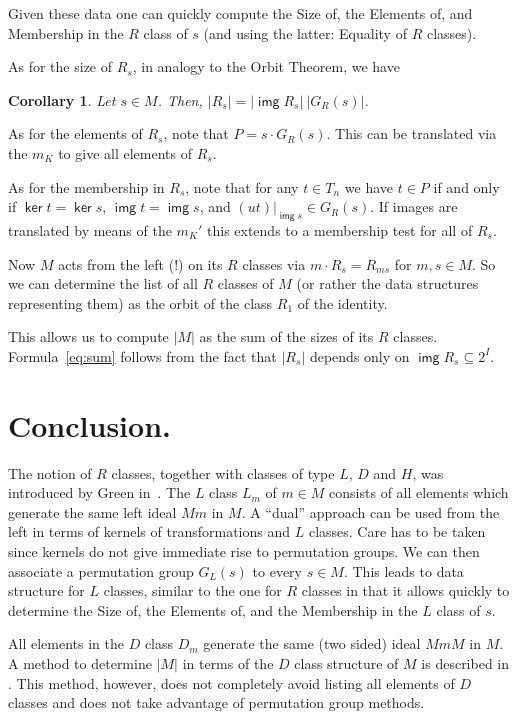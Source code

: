 \documentclass[12pt]{amsart}
\newtheorem{Cor}[Thm]{Corollary}
\newcommand{\img}{\mathop{\mathsf{img}}}
\renewcommand{\ker}{\mathop{\mathsf{ker}}}
\newcommand{\rest}{\big|}  %
\begin{document}
Given these  data one can quickly  compute the Size  of, the Elements of, and
Membership in the $R$ class  of $s$ (and using  the  latter: Equality of  $R$
classes).

As for the size of $R_s$, in analogy to the Orbit Theorem, we have
\begin{Cor}
  Let $s \in M$.  Then, $|R_s| = |\img R_s|\ |G_R(s)|$.
\end{Cor}

As for the  elements of $R_s$,  note that $P =  s \cdot G_R(s)$.  This can be
translated via the $m_K$ to give all elements of $R_s$.

As for the membership in $R_s$, note that for any $t \in T_n$  we have $t \in
P$ if and only if $\ker t = \ker s$, $\img t  = \img s$, and $(ut)\rest_{\img
  s} \in G_R(s)$.    If images are translated  by  means of  the $m_K'$  this
extends to a membership test for all of $R_s$.

Now $M$ acts from the left (!) on its $R$ classes  via $m \cdot R_s = R_{ms}$
for $m, s \in M$.  So we can determine the list of all $R$ classes of $M$ (or
rather the data structures representing them) as the orbit of the class $R_1$
of the identity.

This allows us to compute $|M|$ as the sum  of the sizes of  its $R$ classes. 
Formula~\ref{eq:sum}  follows  from the  fact  that  $|R_s|$ depends  only on
$\img R_s \subseteq 2^I$.

\section{Conclusion.}
The  notion of $R$ classes,  together with classes of type  $L$, $D$ and $H$,
was introduced by Green in~\cite{Green51}.  The $L$  class $L_m$ of $m \in M$
consists of all elements which generate  the same left  ideal $Mm$ in $M$.  A
``dual''  approach  can  be  used  from the   left in  terms   of kernels  of
transformations and $L$ classes.   Care has to  be taken since kernels do not
give   immediate  rise to  permutation   groups.  We  can  then  associate  a
permutation group $G_L(s)$ to every $s \in M$.  This  leads to data structure
for $L$ classes, similar to the one for $R$ classes in that it allows quickly
to  determine the Size  of, the Elements  of,  and the  Membership in the $L$
class of $s$.

All elements in the $D$ class $D_m$ generate the same (two sided) ideal $MmM$
in $M$.  A method to determine $|M|$ in  terms of the  $D$ class structure of
$M$ is described in \cite{LaMc90}.  This method, however, does not completely
avoid listing all   elements of $D$  classes  and does not take  advantage of
permutation group methods.
\end{document}
